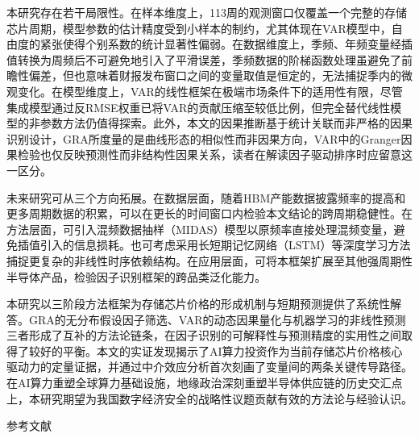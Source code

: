 \documentclass[a4paper,12pt,fontset=fandol]{ctexart}
\begin{document}
本研究存在若干局限性。在样本维度上，113周的观测窗口仅覆盖一个完整的存储芯片周期，模型参数的估计精度受到小样本的制约，尤其体现在VAR模型中，自由度的紧张使得个别系数的统计显著性偏弱。在数据维度上，季频、年频变量经插值转换为周频后不可避免地引入了平滑误差，季频数据的阶梯函数处理虽避免了前瞻性偏差，但也意味着财报发布窗口之间的变量取值是恒定的，无法捕捉季内的微观变化。在模型维度上，VAR的线性框架在极端市场条件下的适用性有限，尽管集成模型通过反RMSE权重已将VAR的贡献压缩至较低比例，但完全替代线性模型的非参数方法仍值得探索。此外，本文的因果推断基于统计关联而非严格的因果识别设计，GRA所度量的是曲线形态的相似性而非因果方向，VAR中的Granger因果检验也仅反映预测性而非结构性因果关系，读者在解读因子驱动排序时应留意这一区分。

未来研究可从三个方向拓展。在数据层面，随着HBM产能数据披露频率的提高和更多周期数据的积累，可以在更长的时间窗口内检验本文结论的跨周期稳健性。在方法层面，可引入混频数据抽样（MIDAS）模型以原频率直接处理混频变量，避免插值引入的信息损耗。也可考虑采用长短期记忆网络（LSTM）等深度学习方法捕捉更复杂的非线性时序依赖结构\cite{rossi2021}\cite{petropoulos2020}。在应用层面，可将本框架扩展至其他强周期性半导体产品，检验因子识别框架的跨品类泛化能力。

本研究以三阶段方法框架为存储芯片价格的形成机制与短期预测提供了系统性解答。GRA的无分布假设因子筛选、VAR的动态因果量化与机器学习的非线性预测三者形成了互补的方法论链条，在因子识别的可解释性与预测精度的实用性之间取得了较好的平衡。本文的实证发现揭示了AI算力投资作为当前存储芯片价格核心驱动力的定量证据，并通过中介效应分析首次刻画了变量间的两条关键传导路径。在AI算力重塑全球算力基础设施，地缘政治深刻重塑半导体供应链的历史交汇点上，本研究期望为我国数字经济安全的战略性议题贡献有效的方法论与经验认识。


\newpage
{}
{}
\begin{center}
{\heiti{} 参考文献}
\end{center}
\vspace{6pt}
\end{document}
